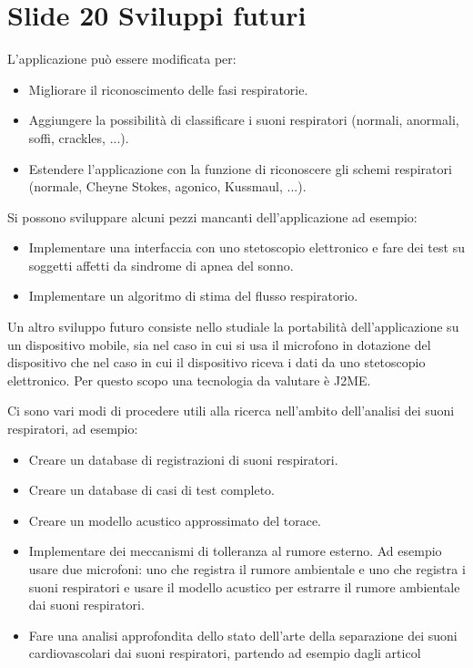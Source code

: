 \section{Slide 20 Sviluppi futuri}

    L'applicazione pu\`o essere modificata per:
    \begin{itemize}
      \item
	Migliorare il riconoscimento delle fasi respiratorie.
      \item
	Aggiungere la possibilit\`a di classificare i suoni respiratori (normali, anormali, soffi, crackles, ...).
      \item
	Estendere l'applicazione con la funzione di riconoscere gli schemi respiratori (normale, Cheyne Stokes, agonico, Kussmaul, ...).
    \end{itemize}


    Si possono sviluppare alcuni pezzi mancanti dell'applicazione ad esempio:
    \begin{itemize}
      \item 
	Implementare una interfaccia con uno stetoscopio elettronico e fare dei test su soggetti affetti da sindrome di apnea del sonno.
      \item
	Implementare un algoritmo di stima del flusso respiratorio.
    \end{itemize}
  

    Un altro sviluppo futuro consiste nello studiale la portabilit\`a dell'applicazione su un dispositivo mobile, sia nel caso in cui si usa il microfono in dotazione del dispositivo che nel caso in cui il dispositivo riceva i dati da uno stetoscopio elettronico. 
    Per questo scopo una tecnologia da valutare \`e J2ME.


    Ci sono vari modi di procedere utili alla ricerca nell'ambito dell'analisi dei suoni respiratori, ad esempio:
    \begin{itemize}
      \item
	Creare un database di registrazioni di suoni respiratori.
      \item	
	Creare un database di casi di test completo. 
      \item	
	Creare un modello acustico approssimato del torace.
      \item
	Implementare dei meccanismi di tolleranza al rumore esterno. 
	Ad esempio usare due microfoni: uno che registra il rumore ambientale e uno che registra i suoni respiratori e usare il modello acustico per estrarre il rumore ambientale dai suoni respiratori.
      \item
	Fare una analisi approfondita dello stato dell'arte della separazione dei suoni cardiovascolari dai suoni respiratori, partendo ad esempio dagli articol
    \end{itemize}
